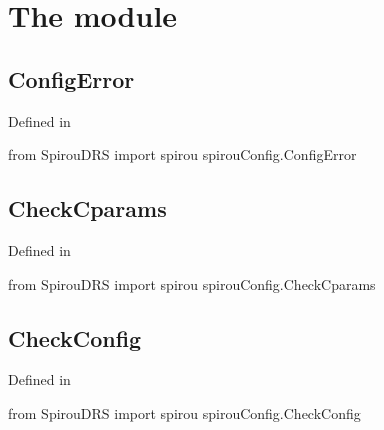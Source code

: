 
\clearpage
\newpage
\begin{minipage}{\textwidth}
\section{The  module}
\label{ch:the_module:}

\subsection{ConfigError}

Defined in \spirou {}

\begin{pythonbox}
from SpirouDRS import spirou
spirouConfig.ConfigError

\end{pythonbox}

\begin{pythondocstring}

\end{pythondocstring}
\end{minipage}

\begin{minipage}{\textwidth}
\subsection{CheckCparams}

Defined in \spirou {}

\begin{pythonbox}
from SpirouDRS import spirou
spirouConfig.CheckCparams

\end{pythonbox}

\begin{pythondocstring}

\end{pythondocstring}
\end{minipage}

\begin{minipage}{\textwidth}
\subsection{CheckConfig}

Defined in \spirou {}

\begin{pythonbox}
from SpirouDRS import spirou
spirouConfig.CheckConfig

\end{pythonbox}

\begin{pythondocstring}

\end{pythondocstring}
\end{minipage}

